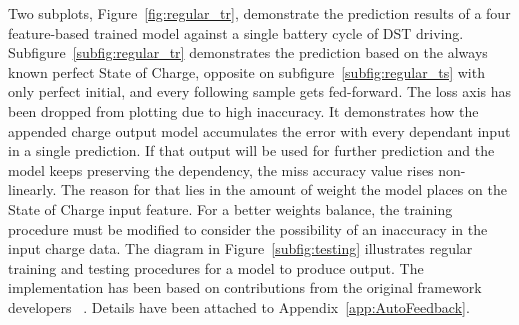 %
%
Two subplots, \mbox{Figure~\ref{fig:regular_tr}}, demonstrate the prediction results of a four feature-based trained model against a single battery cycle of DST driving.
\mbox{Subfigure~\ref{subfig:regular_tr}} demonstrates the prediction based on the always known perfect State of Charge, opposite on \mbox{subfigure~\ref{subfig:regular_ts}} with only perfect initial, and every following sample gets fed-forward.
The loss axis has been dropped from plotting due to high inaccuracy.
It demonstrates how the appended charge output model accumulates the error with every dependant input in a single prediction.
If that output will be used for further prediction and the model keeps preserving the dependency, the miss accuracy value rises non-linearly.
The reason for that lies in the amount of weight the model places on the State of Charge input feature.
For a better weights balance, the training procedure must be modified to consider the possibility of an inaccuracy in the input charge data.
The diagram in \mbox{Figure~\ref{subfig:testing}} illustrates regular training and testing procedures for a model to produce output.
The implementation has been based on contributions from the original framework developers ~\cite{time_2020}.
Details have been attached to Appendix~\ref{app:AutoFeedback}.
